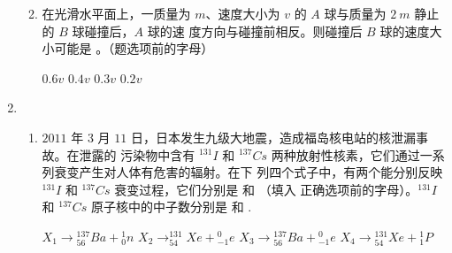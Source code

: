 \begin{enumerate}
\begin{enumerate}

\item 
在光滑水平面上，一质量为 $ m $、速度大小为 $ v $ 的 $ A $ 球与质量为 $ 2 \ m $ 静止的 $ B $ 球碰撞后，$ A $ 球的速
度方向与碰撞前相反。则碰撞后 $ B $ 球的速度大小可能是 \underlinegap 。（题选项前的字母）
\begin{figure}[h!]
	\centering
	
\end{figure}

\fourchoices
{$ 0.6v $}
{$ 0.4v $}
{$ 0.3v $}
{$ 0.2v $}





	
\end{enumerate}



\item
{}
\begin{enumerate}
	\item
$ 2011 $ 年 $ 3 $ 月 $ 11 $ 日，日本发生九级大地震，造成福岛核电站的核泄漏事故。在泄露的
污染物中含有 $ ^{131}I $ 和 $ ^{137}Cs $ 两种放射性核素，它们通过一系列衰变产生对人体有危害的辐射。在下
列四个式子中，有两个能分别反映 $ ^{131}I $ 和 $ ^{137}Cs $ 衰变过程，它们分别是 \underlinegap 和 \underlinegap （填入
正确选项前的字母）。$ ^{131}I $ 和 $ ^{137}Cs $ 原子核中的中子数分别是 \underlinegap 和 \underlinegap .


\fourchoices
{$X_{1} \rightarrow{ }_{56}^{137} B a+{ }_{0}^{1} n$}
{$X_{2} \rightarrow_{54}^{131} X e+{ }_{-1}^{0} e$}
{$X_{3} \rightarrow{ }_{56}^{137} B a+{ }_{-1}^{0} e$}
{$X_{4} \rightarrow{ }_{54}^{131} X e+{ }_{1}^{1} P$}


 

\end{enumerate}
\end{enumerate}
